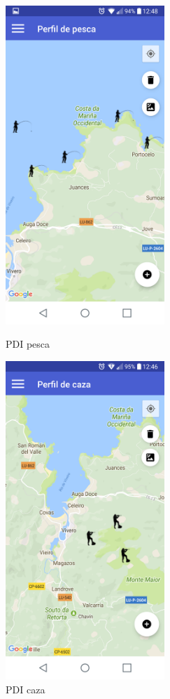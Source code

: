 \begin{figure}[htbp]
\begin{minipage}[b]{0.5\linewidth} %
\centering
\includegraphics[width=6cm]{capturamovil/pdipesca.png}
 
\caption{PDI pesca}
\label{fig:pdipesca}
\end{minipage}
\hspace{0.5cm} %
\begin{minipage}[b]{0.5\linewidth}
\centering
\includegraphics[width=6cm]{capturamovil/pdicaza.png}

\caption{PDI caza}
\label{fig:pdicaza}
\end{minipage}
\end{figure}




